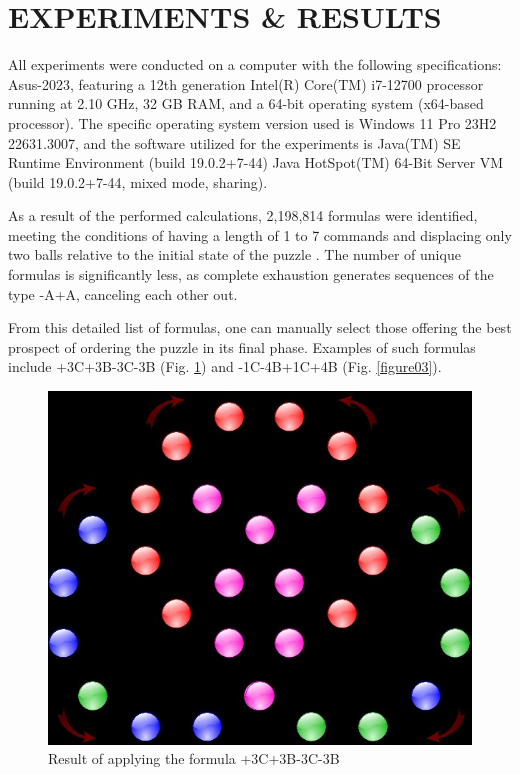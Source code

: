 \documentclass[a4paper,twocolumn,10pt]{article}
\begin{document}
\section{EXPERIMENTS \& RESULTS}

All experiments were conducted on a computer with the following specifications: Asus-2023, featuring a 12th generation Intel(R) Core(TM) i7-12700 processor running at 2.10 GHz, 32 GB RAM, and a 64-bit operating system (x64-based processor). The specific operating system version used is Windows 11 Pro 23H2 22631.3007, and the software utilized for the experiments is Java(TM) SE Runtime Environment (build 19.0.2+7-44) Java HotSpot(TM) 64-Bit Server VM (build 19.0.2+7-44, mixed mode, sharing).

As a result of the performed calculations, 2,198,814 formulas were identified, meeting the conditions of having a length of 1 to 7 commands and displacing only two balls relative to the initial state of the puzzle \cite{Balabanov2024b}. The number of unique formulas is significantly less, as complete exhaustion generates sequences of the type -A+A, canceling each other out.

From this detailed list of formulas, one can manually select those offering the best prospect of ordering the puzzle in its final phase. Examples of such formulas include +3C+3B-3C-3B (Fig. \ref{figure02}) and -1C-4B+1C+4B (Fig. \ref{figure03}).

\begin{figure}
	\centering
	\includegraphics[width=1.0\linewidth]{figure02.png}
	\caption{Result of applying the formula +3C+3B-3C-3B}
	\label{figure02}
\end{figure}
\end{document}
